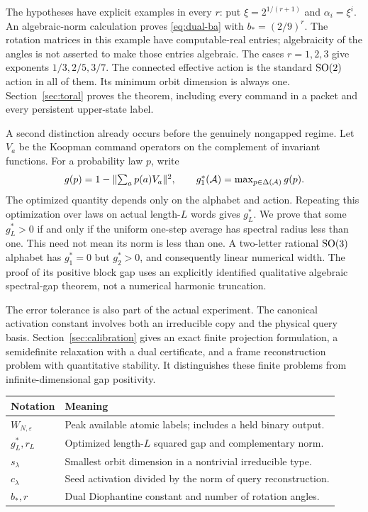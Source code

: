 The hypotheses have explicit examples in every $r$: put $\xi=2^{1/(r+1)}$ and $\alpha_i=\xi^i$. An algebraic-norm calculation proves \eqref{eq:dual-ba} with $b_*=(2/9)^r$. The rotation matrices in this example have computable-real entries; algebraicity of the angles is not asserted to make those entries algebraic. The cases $r=1,2,3$ give exponents $1/3,2/5,3/7$. The connected effective action is the standard $\operatorname{SO}(2)$ action in all of them. Its minimum orbit dimension is always one. Section~\ref{sec:toral} proves the theorem, including every command in a packet and every persistent upper-state label.

A second distinction already occurs before the genuinely nongapped regime. Let $V_a$ be the Koopman command operators on the complement of invariant functions. For a probability law $p$, write
\[
 g(p)=1-\lVert\textstyle\sum_a p(a)V_a\rVert^{2},\qquad
 g_1^*(\mathcal A)=\max_{p\in\Delta(\mathcal A)}g(p).
\]
The optimized quantity depends only on the alphabet and action. Repeating this optimization over laws on actual length-$L$ words gives $g_L^*$. We prove that some $g_L^*>0$ if and only if the uniform one-step average has spectral radius less than one. This need not mean its norm is less than one. A two-letter rational $\operatorname{SO}(3)$ alphabet has $g_1^*=0$ but $g_2^*>0$, and consequently linear numerical width. The proof of its positive block gap uses an explicitly identified qualitative algebraic spectral-gap theorem, not a numerical harmonic truncation.

The error tolerance is also part of the actual experiment. The canonical activation constant involves both an irreducible copy and the physical query basis. Section~\ref{sec:calibration} gives an exact finite projection formulation, a semidefinite relaxation with a dual certificate, and a frame reconstruction problem with quantitative stability. It distinguishes these finite problems from infinite-dimensional gap positivity.

\begin{center}\small
\begin{tabular}{p{}p{}}
\toprule
Notation & Meaning\\
\midrule
$W_{N,\varepsilon}$ & Peak available atomic labels; includes a held binary output.\\
$g_L^*,r_L$ & Optimized length-$L$ squared gap and complementary norm.\\
$s_\lambda$ & Smallest orbit dimension in a nontrivial irreducible type.\\
$c_\lambda$ & Seed activation divided by the norm of query reconstruction.\\
$b_*,r$ & Dual Diophantine constant and number of rotation angles.\\
\bottomrule
\end{tabular}
\end{center}

